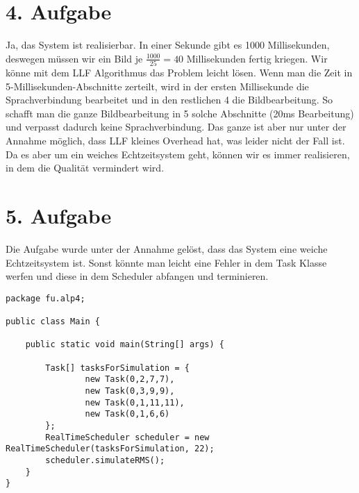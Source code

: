 \section*{4. Aufgabe}
Ja, das System ist realisierbar. In einer Sekunde gibt es 1000 Millisekunden, deswegen müssen wir ein Bild je $\frac{1000}{25} = 40$ Millisekunden fertig kriegen. Wir könne mit dem LLF Algorithmus das Problem leicht lösen. Wenn man die Zeit in 5-Millisekunden-Abschnitte zerteilt, wird in der ersten Millisekunde die Sprachverbindung bearbeitet und in den restlichen 4 die Bildbearbeitung. So schafft man die ganze Bildbearbeitung in 5 solche Abschnitte (20ms Bearbeitung) und verpasst dadurch keine Sprachverbindung. Das ganze ist aber nur unter der Annahme möglich, dass LLF kleines Overhead hat, was leider nicht der Fall ist. Da es aber um ein weiches Echtzeitsystem geht, können wir es immer realisieren, in dem die Qualität vermindert wird.

\clearpage

\section*{5. Aufgabe}

Die Aufgabe wurde unter der Annahme gelöst, dass das System eine weiche Echtzeitsystem ist. Sonst könnte man leicht eine Fehler in dem Task Klasse werfen und diese in dem Scheduler abfangen und terminieren.

\begin{lstlisting}[style=java]
package fu.alp4;

public class Main {

    public static void main(String[] args) {

        Task[] tasksForSimulation = {
                new Task(0,2,7,7),
                new Task(0,3,9,9),
                new Task(0,1,11,11),
                new Task(0,1,6,6)
        };
        RealTimeScheduler scheduler = new RealTimeScheduler(tasksForSimulation, 22);
        scheduler.simulateRMS();
    }
}

\end{lstlisting}


